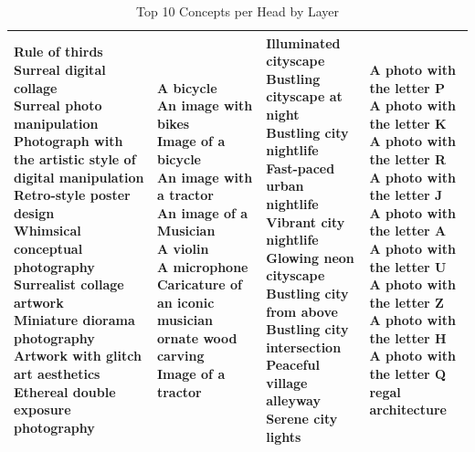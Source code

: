 \documentclass{article}
\begin{document}
\begin{table}[htbp]
\begin{tabular}{|p{4.0cm}|p{4.0cm}|p{4.0cm}|p{4.0cm}|}
\hline
\makecell[t]{Rule of thirds \\ Surreal digital collage \\ Surreal photo manipulation \\ Photograph with the artistic style of digital manipulation \\ Retro-style poster design \\ Whimsical conceptual photography \\ Surrealist collage artwork \\ Miniature diorama photography \\ Artwork with glitch art aesthetics \\ Ethereal double exposure photography} & \makecell[t]{A bicycle \\ An image with bikes \\ Image of a bicycle \\ An image with a tractor \\ An image of a Musician \\ A violin \\ A microphone \\ Caricature of an iconic musician \\ ornate wood carving \\ Image of a tractor} & \makecell[t]{Illuminated cityscape \\ Bustling cityscape at night \\ Bustling city nightlife \\ Fast-paced urban nightlife \\ Vibrant city nightlife \\ Glowing neon cityscape \\ Bustling city from above \\ Bustling city intersection \\ Peaceful village alleyway \\ Serene city lights} & \makecell[t]{A photo with the letter P \\ A photo with the letter K \\ A photo with the letter R \\ A photo with the letter J \\ A photo with the letter A \\ A photo with the letter U \\ A photo with the letter Z \\ A photo with the letter H \\ A photo with the letter Q \\ regal architecture} \\
\hline
\end{tabular}
\caption{Top 10 Concepts per Head by Layer}
\label{tab:layer_heads}
\end{table}
\end{document}
